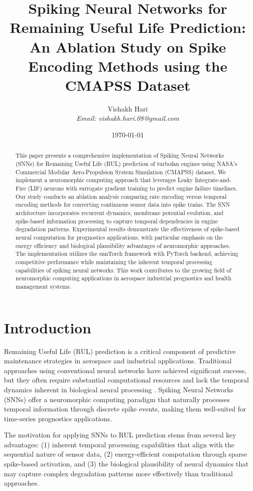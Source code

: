 \documentclass[11pt]{article}
\title{\textbf{Spiking Neural Networks for Remaining Useful Life Prediction:\\
An Ablation Study on Spike Encoding Methods using the CMAPSS Dataset}}
\author{
Vishakh Hari\\
\textit{Email: vishakh.hari.08@gmail.com}
}
\date{\today}
\begin{document}
\maketitle

\begin{abstract}
This paper presents a comprehensive implementation of Spiking Neural Networks (SNNs) for Remaining Useful Life (RUL) prediction of turbofan engines using NASA's Commercial Modular Aero-Propulsion System Simulation (CMAPSS) dataset. We implement a neuromorphic computing approach that leverages Leaky Integrate-and-Fire (LIF) neurons with surrogate gradient training to predict engine failure timelines. Our study conducts an ablation analysis comparing rate encoding versus temporal encoding methods for converting continuous sensor data into spike trains. The SNN architecture incorporates recurrent dynamics, membrane potential evolution, and spike-based information processing to capture temporal dependencies in engine degradation patterns. Experimental results demonstrate the effectiveness of spike-based neural computation for prognostics applications, with particular emphasis on the energy efficiency and biological plausibility advantages of neuromorphic approaches. The implementation utilizes the snnTorch framework with PyTorch backend, achieving competitive performance while maintaining the inherent temporal processing capabilities of spiking neural networks. This work contributes to the growing field of neuromorphic computing applications in aerospace industrial prognostics and health management systems.
\end{abstract}

\section{Introduction}

Remaining Useful Life (RUL) prediction is a critical component of predictive maintenance strategies in aerospace and industrial applications. Traditional approaches using conventional neural networks have achieved significant success, but they often require substantial computational resources and lack the temporal dynamics inherent in biological neural processing \cite{saxena2008damage}. Spiking Neural Networks (SNNs) offer a neuromorphic computing paradigm that naturally processes temporal information through discrete spike events, making them well-suited for time-series prognostics applications.

The motivation for applying SNNs to RUL prediction stems from several key advantages: (1) inherent temporal processing capabilities that align with the sequential nature of sensor data, (2) energy-efficient computation through sparse spike-based activation, and (3) the biological plausibility of neural dynamics that may capture complex degradation patterns more effectively than traditional approaches.
\end{document}
